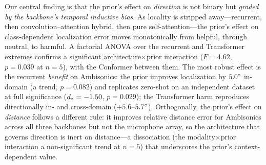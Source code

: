 Our central finding is that the prior's effect on \emph{direction} is not binary
but \emph{graded by the backbone's temporal inductive bias}. As locality is
stripped away---recurrent, then convolution--attention hybrid, then pure
self-attention---the prior's effect on class-dependent localization error moves
monotonically from helpful, through neutral, to harmful. A factorial ANOVA over
the recurrent and Transformer extremes confirms a significant
architecture$\times$prior interaction ($F=4.62$, $p=0.039$ at $n=5$), with the
Conformer between them. The most robust effect is the recurrent \emph{benefit} on
Ambisonics: the prior improves localization by $5.0^\circ$ in-domain (a trend,
$p=0.082$) and replicates zero-shot on an independent
dataset at full significance ($d_z=-1.50$, $p=0.029$); the Transformer harm
reproduces directionally in- and cross-domain ($+5.6$--$5.7^\circ$).
Orthogonally, the prior's effect on \emph{distance} follows a different rule: it
improves relative distance error for Ambisonics across all three backbones but not
the microphone array, so the architecture that governs direction is inert on
distance---a dissociation (the modality$\times$prior interaction a non-significant
trend at $n=5$) that underscores the prior's context-dependent value.

